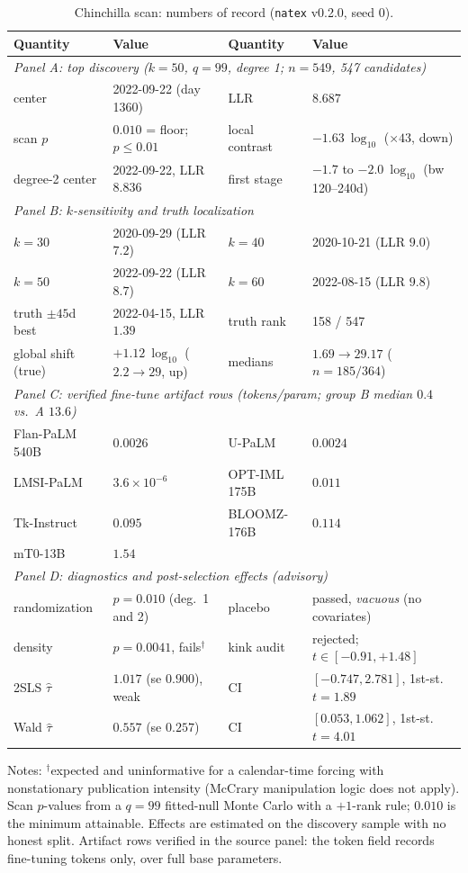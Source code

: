\documentclass[11pt]{article}
\newcommand{\natex}{\texttt{natex}}
\begin{document}
\begin{table}[t]
\centering
\scriptsize
\caption{Chinchilla scan: numbers of record (\natex{} v0.2.0, seed 0).}
\label{tab:main}
\begin{tabular}{llll}
\toprule
Quantity & Value & Quantity & Value \\
\midrule
\multicolumn{4}{l}{\emph{Panel A: top discovery ($k=50$, $q=99$, degree 1; $n=549$, 547 candidates)}}\\
center & 2022-09-22 (day 1360) & LLR & $8.687$ \\
scan $p$ & $0.010$ = floor; $p \leq 0.01$ & local contrast & $-1.63\ \log_{10}$ ($\times 43$, down) \\
degree-2 center & 2022-09-22, LLR $8.836$ & first stage & $-1.7$ to $-2.0\ \log_{10}$ (bw 120--240d) \\
\midrule
\multicolumn{4}{l}{\emph{Panel B: $k$-sensitivity and truth localization}}\\
$k=30$ & 2020-09-29 (LLR $7.2$) & $k=40$ & 2020-10-21 (LLR $9.0$) \\
$k=50$ & 2022-09-22 (LLR $8.7$) & $k=60$ & 2022-08-15 (LLR $9.8$) \\
truth $\pm 45$d best & 2022-04-15, LLR $1.39$ & truth rank & 158 / 547 \\
global shift (true) & $+1.12\ \log_{10}$ ($2.2 \to 29$, up) & medians & $1.69 \to 29.17$ ($n=185/364$) \\
\midrule
\multicolumn{4}{l}{\emph{Panel C: verified fine-tune artifact rows (tokens/param; group B median $0.4$ vs.\ A $13.6$)}}\\
Flan-PaLM 540B & $0.0026$ & U-PaLM & $0.0024$ \\
LMSI-PaLM & $3.6 \times 10^{-6}$ & OPT-IML 175B & $0.011$ \\
Tk-Instruct & $0.095$ & BLOOMZ-176B & $0.114$ \\
mT0-13B & $1.54$ & & \\
\midrule
\multicolumn{4}{l}{\emph{Panel D: diagnostics and post-selection effects (advisory)}}\\
randomization & $p = 0.010$ (deg.\ 1 and 2) & placebo & passed, \emph{vacuous} (no covariates) \\
density & $p = 0.0041$, fails$^{\dagger}$ & kink audit & rejected; $t \in [-0.91, +1.48]$ \\
2SLS $\hat\tau$ & $1.017$ (se $0.900$), weak & CI & $[-0.747, 2.781]$, 1st-st.\ $t=1.89$ \\
Wald $\hat\tau$ & $0.557$ (se $0.257$) & CI & $[0.053, 1.062]$, 1st-st.\ $t=4.01$ \\
\bottomrule
\end{tabular}

\medskip
\parbox{0.95\textwidth}{\scriptsize Notes: $^{\dagger}$expected and
uninformative for a calendar-time forcing with nonstationary publication
intensity (McCrary manipulation logic does not apply). Scan $p$-values from a
$q=99$ fitted-null Monte Carlo with a $+1$-rank rule; $0.010$ is the minimum
attainable. Effects are estimated on the discovery sample with no honest
split. Artifact rows verified in the source panel: the token field records
fine-tuning tokens only, over full base parameters.}
\end{table}
\end{document}
